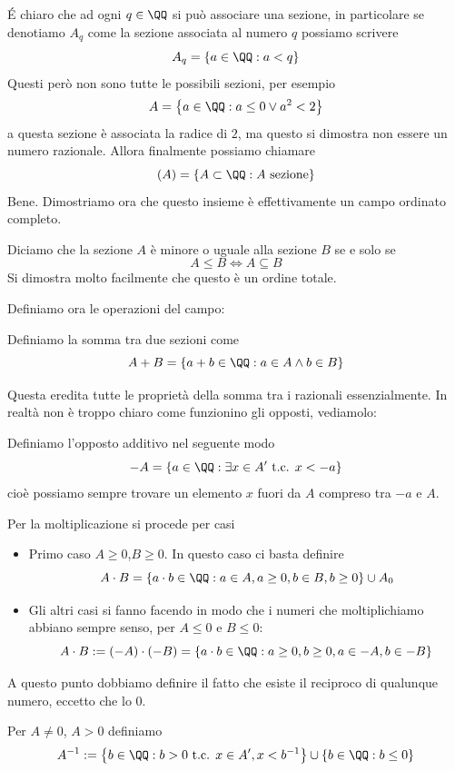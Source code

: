\documentclass[11pt]{scrartcl}
\begin{document}
	\'E chiaro che ad ogni $q\in\QQ$ si può associare una sezione, in particolare se denotiamo $A_q$ come la sezione associata al numero $q$ possiamo scrivere
	$$A_q=\left\{a\in\QQ:a<q\right\}$$
	Questi però non sono tutte le possibili sezioni, per esempio
	$$A=\left\{a\in\QQ:a\le 0 \lor a^2<2\right\}$$
	a questa sezione è associata la radice di $2$, ma questo si dimostra non essere un numero razionale. Allora finalmente possiamo chiamare
	$$\mathcal(A)=\left\{A\subset\QQ:A\text{ sezione}\right\}$$
	Bene. Dimostriamo ora che questo insieme è effettivamente un campo ordinato completo. 
	\begin{definition}
		Diciamo che la sezione $A$ è minore o uguale alla sezione $B$ se e solo se
		$$A\le B \iff A\subseteq B$$
		Si dimostra molto facilmente che questo è un ordine totale.
	\end{definition}
	Definiamo ora le operazioni del campo:
	\begin{definition}[Somma]
		Definiamo la somma tra due sezioni come
		$$A+B=\left\{a+b\in\QQ:a\in A\land b\in B\right\}$$
		
	\end{definition}
	Questa eredita tutte le proprietà della somma tra i razionali essenzialmente. In realtà non è troppo chiaro come funzionino gli opposti, vediamolo:
	\begin{definition}
		Definiamo l'opposto additivo nel seguente modo
		$$-A=\left\{a\in\QQ:\exists x\in A' \text{ t.c. } x<-a\right\}$$
		cioè possiamo sempre trovare un elemento $x$ fuori da $A$ compreso tra $-a$ e $A$.
	\end{definition}
	Per la moltiplicazione si procede per casi
	\begin{itemize}
		\item Primo caso $A\ge 0$,$B\ge 0$. In questo caso ci basta definire
		$$A\cdot B=\left\{a\cdot b\in\QQ:a\in A, a\ge 0,b\in B,b\ge 0\right\}\cup A_0$$
		\item Gli altri casi si fanno facendo in modo che i numeri che moltiplichiamo abbiano sempre senso, per $A\le 0$ e $B\le 0$:
		$$A\cdot B:=(-A)\cdot (-B)=\left\{a\cdot b\in \QQ: a\ge 0,b\ge 0,a\in -A,b\in -B\right\}$$
	\end{itemize}
	A questo punto dobbiamo definire il fatto che esiste il reciproco di qualunque numero, eccetto che lo $0$.
	\begin{definition}
		Per $A\ne 0$, $A>0$ definiamo
		$$A^{-1}:=\left\{b\in\QQ:b>0\text{ t.c. }x\in A',x<b^{-1}\right\}\cup\left\{b\in\QQ:b\le 0\right\}$$
	\end{definition}
\end{document}
